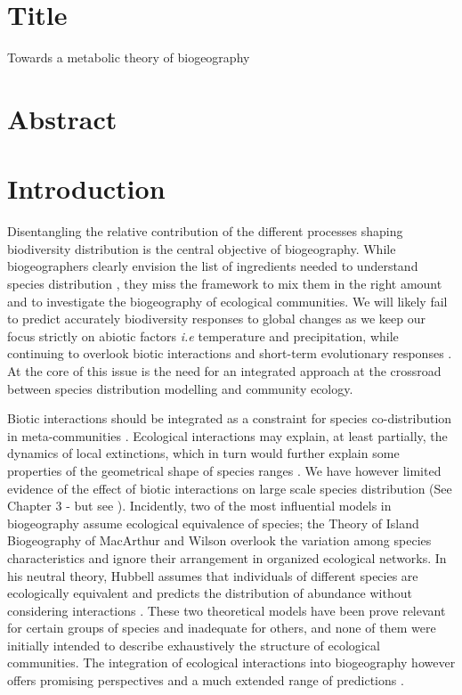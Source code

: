 \section{Title}\label{title}

Towards a metabolic theory of biogeography

\section{Abstract}\label{abstract}

\section{Introduction}\label{introduction}

Disentangling the relative contribution of the different processes
shaping biodiversity distribution is the central objective of
biogeography. While biogeographers clearly envision the list of
ingredients needed to understand species distribution
\citep{Thuiller2013}, they miss the framework to mix them in the right
amount and to investigate the biogeography of ecological communities. We
will likely fail to predict accurately biodiversity responses to global
changes as we keep our focus strictly on abiotic factors \emph{i.e}
temperature and precipitation, while continuing to overlook biotic
interactions \citep{Wiens2011} and short-term evolutionary responses
\citep{Lavergne2010}. At the core of this issue is the need for an
integrated approach at the crossroad between species distribution
modelling and community ecology.

Biotic interactions should be integrated as a constraint for species
co-distribution in meta-communities \citep[ ]{Jabot2012, Cazelles2016a}.
Ecological interactions may explain, at least partially, the dynamics of
local extinctions, which in turn would further explain some properties
of the geometrical shape of species ranges \citep[\emph{e.g.} nested
distributions of parasitoid and its host,][]{Shenbrot2007}. We have
however limited evidence of the effect of biotic interactions on large
scale species distribution (See Chapter 3 - but see
\citet{Gotelli2010}). Incidently, two of the most influential models in
biogeography assume ecological equivalence of species; the Theory of
Island Biogeography of MacArthur and Wilson \citep[hereafter
TIB,][]{MacArthur1967} overlook the variation among species
characteristics and ignore their arrangement in organized ecological
networks. In his neutral theory, Hubbell assumes that individuals of
different species are ecologically equivalent and predicts the
distribution of abundance without considering interactions
\citep{Hubbell1997, Hubbell2001}. These two theoretical models have been
prove relevant for certain groups of species and inadequate for others,
and none of them were initially intended to describe exhaustively the
structure of ecological communities. The integration of ecological
interactions into biogeography however offers promising perspectives and
a much extended range of predictions \citep{Holt2010, Gravel2011}.

